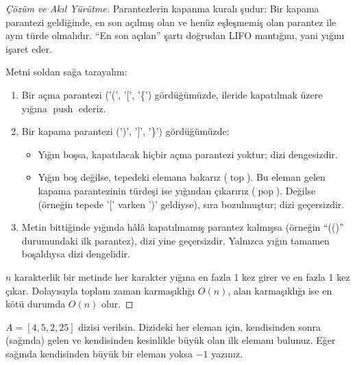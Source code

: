 \begin{proof}[Çözüm ve Akıl Yürütme]
Parantezlerin kapanma kuralı şudur: Bir kapama parantezi geldiğinde, en son açılmış olan ve henüz eşleşmemiş olan parantez ile aynı türde olmalıdır. ``En son açılan'' şartı doğrudan LIFO mantığını, yani yığını işaret eder.

Metni soldan sağa tarayalım:
\begin{enumerate}
    \item Bir açma parantezi ('(', '[', '\{') gördüğümüzde, ileride kapatılmak üzere yığına $\operatorname{push}$ ederiz.
    \item Bir kapama parantezi (')', ']', '\}') gördüğümüzde:
    \begin{itemize}
        \item Yığın boşsa, kapatılacak hiçbir açma parantezi yoktur; dizi dengesizdir.
        \item Yığın boş değilse, tepedeki elemana bakarız ($\operatorname{top}$). Bu eleman gelen kapama parantezinin türdeşi ise yığından çıkarırız ($\operatorname{pop}$). Değilse (örneğin tepede '[' varken ')' geldiyse), sıra bozulmuştur; dizi geçersizdir.
    \end{itemize}
    \item Metin bittiğinde yığında hâlâ kapatılmamış parantez kalmışsa (örneğin ``(()'' durumundaki ilk parantez), dizi yine geçersizdir. Yalnızca yığın tamamen boşaldıysa dizi dengelidir.
\end{enumerate}

$n$ karakterlik bir metinde her karakter yığına en fazla 1 kez girer ve en fazla 1 kez çıkar. Dolayısıyla toplam zaman karmaşıklığı $O(n)$, alan karmaşıklığı ise en kötü durumda $O(n)$ olur.
\end{proof}

\begin{example}
$A = [4, 5, 2, 25]$ dizisi verilsin. Dizideki her eleman için, kendisinden sonra (sağında) gelen ve kendisinden kesinlikle büyük olan ilk elemanı bulunuz. Eğer sağında kendisinden büyük bir eleman yoksa $-1$ yazınız.
\end{example}

